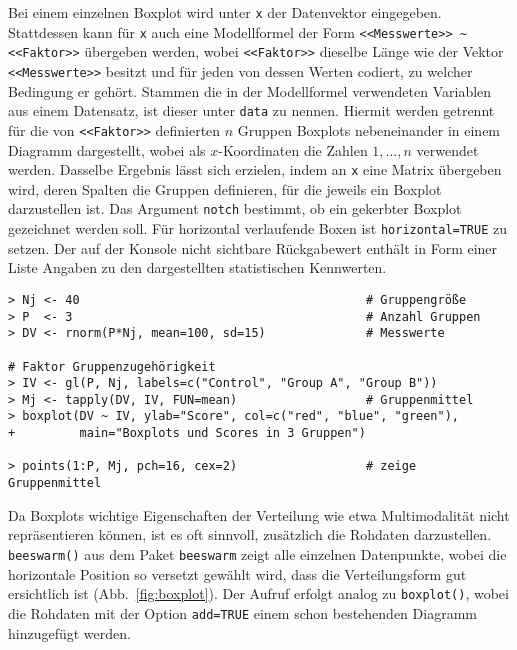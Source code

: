 Bei einem einzelnen Boxplot wird unter \lstinline!x! der Datenvektor eingegeben. Stattdessen kann für \lstinline!x! auch eine Modellformel der Form \lstinline!<<Messwerte>> ~ <<Faktor>>! übergeben werden, wobei \lstinline!<<Faktor>>! dieselbe Länge wie der Vektor \lstinline!<<Messwerte>>! besitzt und für jeden von dessen Werten codiert, zu welcher Bedingung er gehört. Stammen die in der Modellformel verwendeten Variablen aus einem Datensatz, ist dieser unter \lstinline!data! zu nennen. Hiermit werden getrennt für die von \lstinline!<<Faktor>>! definierten $n$ Gruppen Boxplots nebeneinander in einem Diagramm dargestellt, wobei als $x$-Koordinaten die Zahlen $1, \ldots, n$ verwendet werden. Dasselbe Ergebnis lässt sich erzielen, indem an \lstinline!x! eine Matrix übergeben wird, deren Spalten die Gruppen definieren, für die jeweils ein Boxplot darzustellen ist. Das Argument \lstinline!notch! bestimmt, ob ein gekerbter Boxplot gezeichnet werden soll. Für horizontal verlaufende Boxen ist \lstinline!horizontal=TRUE! zu setzen. Der auf der Konsole nicht sichtbare Rückgabewert enthält in Form einer Liste Angaben zu den dargestellten statistischen Kennwerten.
\begin{lstlisting}
> Nj <- 40                                        # Gruppengröße
> P  <- 3                                         # Anzahl Gruppen
> DV <- rnorm(P*Nj, mean=100, sd=15)              # Messwerte

# Faktor Gruppenzugehörigkeit
> IV <- gl(P, Nj, labels=c("Control", "Group A", "Group B"))
> Mj <- tapply(DV, IV, FUN=mean)                  # Gruppenmittel
> boxplot(DV ~ IV, ylab="Score", col=c("red", "blue", "green"),
+         main="Boxplots und Scores in 3 Gruppen")

> points(1:P, Mj, pch=16, cex=2)                  # zeige Gruppenmittel
\end{lstlisting}

Da Boxplots wichtige Eigenschaften der Verteilung wie etwa Multimodalität nicht repräsentieren können, ist es oft sinnvoll, zusätzlich die Rohdaten darzustellen. \lstinline!beeswarm()! aus dem Paket \lstinline!beeswarm! \cite{Eklund2016} zeigt alle einzelnen Datenpunkte, wobei die horizontale Position so versetzt gewählt wird, dass die Verteilungsform gut ersichtlich ist (Abb.\ \ref{fig:boxplot}). Der Aufruf erfolgt analog zu \lstinline!boxplot()!, wobei die Rohdaten mit der Option \lstinline!add=TRUE! einem schon bestehenden Diagramm hinzugefügt werden.

